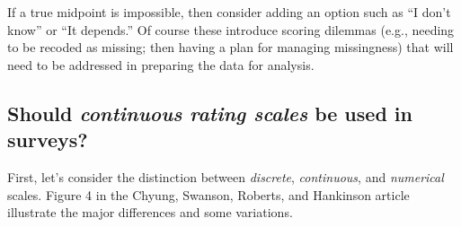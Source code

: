 \documentclass[
  english,
]{book}
\begin{document}
If a true midpoint is impossible, then consider adding an option such as ``I don't know'' or ``It depends.'' Of course these introduce scoring dilemmas (e.g., needing to be recoded as missing; then having a plan for managing missingness) that will need to be addressed in preparing the data for analysis.

\hypertarget{should-continuous-rating-scales-be-used-in-surveys}{%
\subsection{\texorpdfstring{Should \emph{continuous rating scales} be used in surveys?}{Should continuous rating scales be used in surveys?}}\label{should-continuous-rating-scales-be-used-in-surveys}}

First, let's consider the distinction between \emph{discrete}, \emph{continuous}, and \emph{numerical} scales. Figure 4 in the Chyung, Swanson, Roberts, and Hankinson \citeyearpar{chyung_evidencebased_2018-1} article illustrate the major differences and some variations.
\end{document}
